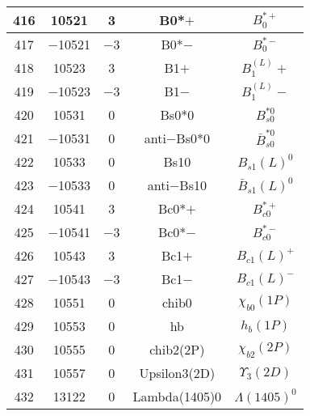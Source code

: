\documentclass{article}
\begin{document}
\begin{table}[!htbp]
\begin{tabular}{|c|c|c|c|c|}
\hline
416 & 10521 & 3 & B\underline{\hspace{0.6em}}0*$+$ & $B_{0}^{*+}$ \\
\hline
417 & $-$10521 & $-$3 & B\underline{\hspace{0.6em}}0*$-$ & $B_{0}^{*-}$ \\
\hline
418 & 10523 & 3 & B\underline{\hspace{0.6em}}1$+$ & $B_{1}^(L){+}$ \\
\hline
419 & $-$10523 & $-$3 & B\underline{\hspace{0.6em}}1$-$ & $B_{1}^(L){-}$ \\
\hline
420 & 10531 & 0 & B\underline{\hspace{0.6em}}s0*0 & $B_{s0}^{*0}$ \\
\hline
421 & $-$10531 & 0 & anti$-$B\underline{\hspace{0.6em}}s0*0 & $\bar{B}_{s0}^{*0}$ \\
\hline
422 & 10533 & 0 & B\underline{\hspace{0.6em}}s10 & $B_{s1}(L)^{0}$ \\
\hline
423 & $-$10533 & 0 & anti$-$B\underline{\hspace{0.6em}}s10 & $\bar{B}_{s1}(L)^{0}$ \\
\hline
424 & 10541 & 3 & B\underline{\hspace{0.6em}}c0*$+$ & $B_{c0}^{*+}$ \\
\hline
425 & $-$10541 & $-$3 & B\underline{\hspace{0.6em}}c0*$-$ & $B_{c0}^{*-}$ \\
\hline
426 & 10543 & 3 & B\underline{\hspace{0.6em}}c1$+$ & $B_{c1}(L)^{+}$ \\
\hline
427 & $-$10543 & $-$3 & B\underline{\hspace{0.6em}}c1$-$ & $B_{c1}(L)^{-}$ \\
\hline
428 & 10551 & 0 & chi\underline{\hspace{0.6em}}b0 & $\chi_{b0}(1P)$ \\
\hline
429 & 10553 & 0 & h\underline{\hspace{0.6em}}b & $h_{b}(1P)$ \\
\hline
430 & 10555 & 0 & chi\underline{\hspace{0.6em}}b2(2P) & $\chi_{b2}(2P)$ \\
\hline
431 & 10557 & 0 & Upsilon\underline{\hspace{0.6em}}3(2D) & $\Upsilon_{3}(2D)$ \\
\hline
432 & 13122 & 0 & Lambda(1405)0 & $\Lambda(1405)^{0}$ \\

\end{tabular}
\end{table}
\end{document}
